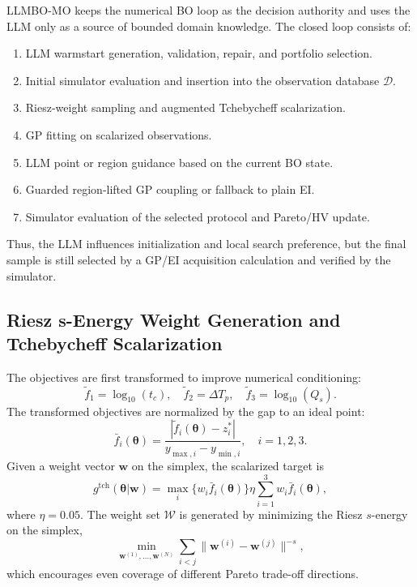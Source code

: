 \documentclass[journal]{IEEEtran}
\newcommand{\btheta}{\boldsymbol{\theta}}
\newcommand{\bw}{\boldsymbol{w}}
\newcommand{\bD}{\mathcal{D}}
\newcommand{\bW}{\mathcal{W}}
\begin{document}
LLMBO-MO keeps the numerical BO loop as the decision authority and uses the LLM
only as a source of bounded domain knowledge. The closed loop consists of:
\begin{enumerate}
\item LLM warmstart generation, validation, repair, and portfolio selection.
\item Initial simulator evaluation and insertion into the observation database
$\bD$.
\item Riesz-weight sampling and augmented Tchebycheff scalarization.
\item GP fitting on scalarized observations.
\item LLM point or region guidance based on the current BO state.
\item Guarded region-lifted GP coupling or fallback to plain EI.
\item Simulator evaluation of the selected protocol and Pareto/HV update.
\end{enumerate}
Thus, the LLM influences initialization and local search preference, but the
final sample is still selected by a GP/EI acquisition calculation and verified
by the simulator.

\subsection{Riesz s-Energy Weight Generation and Tchebycheff Scalarization}

The objectives are first transformed to improve numerical conditioning:
\begin{equation}
\tilde f_1=\log_{10}(t_c),\quad
\tilde f_2=\Delta T_p,\quad
\tilde f_3=\log_{10}(Q_s).
\label{eq:log}
\end{equation}
The transformed objectives are normalized by the gap to an ideal point:
\begin{equation}
\bar f_i(\btheta)=
\frac{|\tilde f_i(\btheta)-z_i^\ast|}
{y_{\max,i}-y_{\min,i}},\quad i=1,2,3.
\label{eq:norm}
\end{equation}
Given a weight vector $\bw$ on the simplex, the scalarized target is
\begin{equation}
g^{\mathrm{tch}}(\btheta|\bw)
=\max_i\{w_i\bar f_i(\btheta)\}
\eta\sum_{i=1}^{3}w_i\bar f_i(\btheta),
\label{eq:tch}
\end{equation}
where $\eta=0.05$. The weight set $\bW$ is generated by minimizing the Riesz
$s$-energy on the simplex,
\begin{equation}
\min_{\bw^{(1)},\ldots,\bw^{(N)}}\sum_{i<j}
\|\bw^{(i)}-\bw^{(j)}\|^{-s},
\label{eq:riesz}
\end{equation}
which encourages even coverage of different Pareto trade-off directions.
\end{document}
